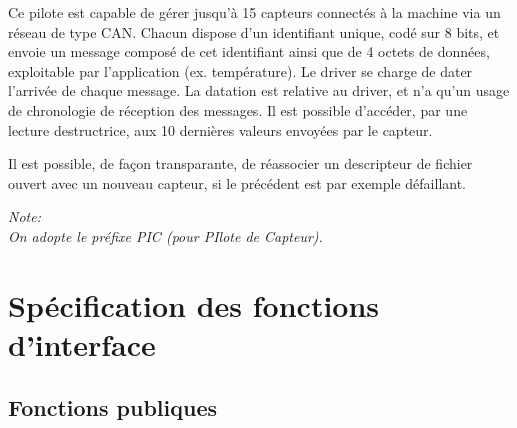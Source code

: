 

Ce pilote est capable de gérer jusqu'à 15 capteurs connectés à la 
machine via un réseau de type CAN. Chacun dispose d'un identifiant
unique, codé sur 8 bits, et envoie un message composé de cet
identifiant ainsi que de 4 octets de données, exploitable par
l'application (ex. température).
Le driver se charge de dater l'arrivée de chaque message.
La datation est relative au driver, et n'a qu'un usage
de chronologie de réception des messages.
Il est possible d'accéder, par une lecture destructrice, aux
10 dernières valeurs envoyées par le capteur.

Il est possible, de façon transparante, de réassocier un descripteur
de fichier ouvert avec un nouveau capteur, si le précédent est 
par exemple défaillant.

\textsl{
Note:\\
On adopte le préfixe PIC (pour PIlote de Capteur).
}

\section{Spécification des fonctions d'interface}

\subsection{Fonctions publiques}

